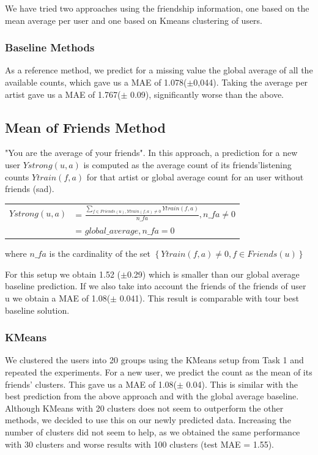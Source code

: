We have tried two approaches using the friendship information, one based on the mean average per user and one based on Kmeans clustering of users.

\subsubsection{Baseline Methods}
As a reference method, we predict for a missing value the global average of all the available counts, which gave us a MAE of 1.078($\pm$0,044). Taking the average per artist gave us a MAE of 1.767($\pm$  0.09), significantly worse than the above.

\subsection{Mean of Friends Method}
 "You are the average of your friends". In this approach, a prediction for a new user $Ystrong(u,a)$ is computed as the average count of its friends'listening counts $Ytrain(f,a)$ for that artist or global average count for an user without friends (sad).

\begin{table}[h]
  \centering
  \begin{tabular}{ c  l }
  $Ystrong(u,a) $&= $\frac{\sum_{f\in Friends(u), Ytrain(f,a)\neq0}{Ytrain(f,a)}}{n\_fa}, n\_fa \neq 0$ \\ 
                          &= $global\_average, n\_fa = 0$ \\ 
  \end{tabular}
\end{table}
where $n\_fa$ is the cardinality of the set $\left\{ Ytrain(f,a)\neq0, f\in Friends(u)\right\}$

For this setup  we obtain  1.52 ($\pm$0.29) which is smaller than our global average baseline prediction.
If we also take into account the friends of the friends of user u we obtain  a MAE of 1.08($\pm$ 0.041). This result is comparable with tour best baseline solution.

\subsubsection{KMeans}
We clustered the users into 20 groups using the KMeans setup from Task 1
and repeated the experiments. For a new user,  we predict the count as the mean of its friends' clusters. This gave us a MAE of
1.08($\pm$ 0.04). This is similar with the best prediction from the above approach and with the  global average baseline. Although KMeans with 20 clusters does not seem to outperform the other methods, we decided to use this on our newly predicted data.
Increasing the number of clusters did not seem to help, as we obtained the same performance with 30 clusters and worse results with 100 clusters (test MAE = 1.55). 
 
